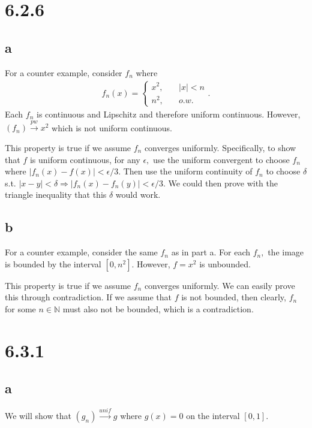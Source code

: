 \documentclass[10pt]{article}
\begin{document}
\section*{6.2.6}

\subsection*{a}

For a counter example, consider $f_n$ where
\begin{align*}
    f_n(x)=\begin{cases}
        x^2,\quad&|x|<n\\
        n^2,\quad&o.w.
    \end{cases}.
\end{align*}
Each $f_n$ is continuous and Lipschitz and therefore uniform continuous. However, $(f_n)\stackrel{pw}{\to}x^2$ which is not uniform continuous.

This property is true if we assume $f_n$ converges uniformly. Specifically, to show that $f$ is uniform continuous, for any $\epsilon,$ use the uniform convergent to choose $f_n$ where $|f_n(x)-f(x)|<\epsilon/3.$ Then use the uniform continuity of $f_n$ to choose $\delta$ s.t. $|x-y|<\delta\Rightarrow |f_n(x)-f_n(y)|<\epsilon/3.$ We could then prove with the triangle inequality that this $\delta$ would work.
\subsection*{b}

For a counter example, consider the same $f_n$ as in part a. For each $f_n,$ the image is bounded by the interval $[0,n^2].$ However, $f=x^2$ is unbounded.

This property is true if we assume $f_n$ converges uniformly. We can easily prove this through contradiction. If we assume that $f$ is not bounded, then clearly, $f_n$ for some $n\in\mathbb{N}$ must also not be bounded, which is a contradiction.

\section*{6.3.1}

\subsection*{a}
We will show that $(g_n)\stackrel{unif}{\to} g$ where $g(x)=0$ on the interval $[0,1].$
\end{document}

